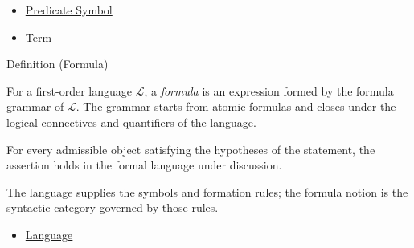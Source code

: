 \begin{dependencies}
\begin{itemize}
  \item \hyperref[def:predicate-symbol]{Predicate Symbol}
  \item \hyperref[def:term]{Term}
\end{itemize}
\end{dependencies}

\begin{definitionbox}{Definition (Formula)}
\begin{definition}[Formula]
\label{def:formula}
For a first-order language \(\mathcal L\), a \emph{formula} is an expression
formed by the formula grammar of \(\mathcal L\). The grammar starts from atomic
formulas and closes under the logical connectives and quantifiers of the
language.
\end{definition}
\end{definitionbox}
\begin{remark*}
For every admissible object satisfying the hypotheses of the statement, the
assertion holds in the formal language under discussion.
\end{remark*}


\begin{remark*}[Interpretation]
The language supplies the symbols and formation rules; the formula notion is
the syntactic category governed by those rules.
\end{remark*}

\begin{dependencies}
\begin{itemize}
  \item \hyperref[def:language]{Language}
\end{itemize}
\end{dependencies}

